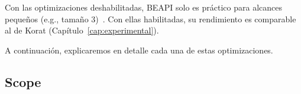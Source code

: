 Con las optimizaciones deshabilitadas, \textsf{BEAPI} solo es práctico para 
alcances pequeños (e.g., tamaño 3)~\cite{Politano20}. Con ellas habilitadas, 
su rendimiento es comparable al de \textsf{Korat} (Capítulo~\ref{cap:experimental}).








A continuación, explicaremos en detalle cada una de estas optimizaciones.

\subsection{Scope}
\label{sec:scope}



